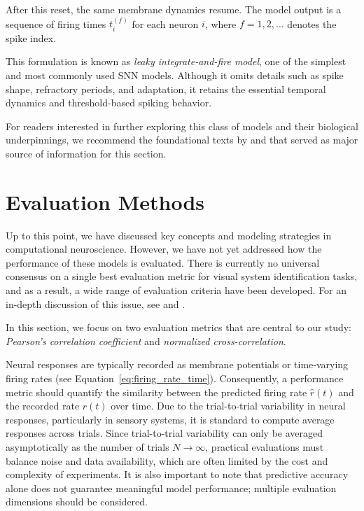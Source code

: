 After this reset, the same membrane dynamics resume. The model output is a sequence of firing times $t^{(f)}_i$ for each neuron $i$, where $f = 1, 2, \dots$ denotes the spike index.

This formulation is known as \emph{leaky integrate-and-fire model}, one of the simplest and most commonly used SNN models. Although it omits details such as spike shape, refractory periods, and adaptation, it retains the essential temporal dynamics and threshold-based spiking behavior.

For readers interested in further exploring this class of models and their biological underpinnings, we recommend the foundational texts by \citet{dayan2005theoretical} and \citet{gerstner2002spiking} that served as major source of information for this section.

\section{Evaluation Methods}
\label{sec:evaluation_methods}

Up to this point, we have discussed key concepts and modeling strategies in computational neuroscience. However, we have not yet addressed how the performance of these models is evaluated. There is currently no universal consensus on a single best evaluation metric for visual system identification tasks, and as a result, a wide range of evaluation criteria have been developed. For an in-depth discussion of this issue, see \citet{pospisil2021eval} and \citet{Carandini10577}.

In this section, we focus on two evaluation metrics that are central to our study: \emph{Pearson's correlation coefficient} and \emph{normalized cross-correlation}.

Neural responses are typically recorded as membrane potentials or time-varying firing rates (see Equation~\ref{eq:firing_rate_time}). Consequently, a performance metric should quantify the similarity between the predicted firing rate $\hat{r}(t)$ and the recorded rate $r(t)$ over time. Due to the trial-to-trial variability in neural responses, particularly in sensory systems, it is standard to compute average responses across trials. Since trial-to-trial variability can only be averaged asymptotically as the number of trials $N \to \infty$, practical evaluations must balance noise and data availability, which are often limited by the cost and complexity of experiments. It is also important to note that predictive accuracy alone does not guarantee meaningful model performance; multiple evaluation dimensions should be considered.

